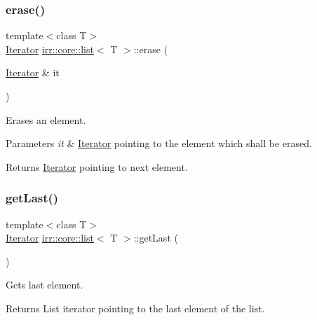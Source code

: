 \subsubsection{\texorpdfstring{erase()}{erase()}}
{\footnotesize\ttfamily template$<$class T$>$ \\
\hyperlink{classirr_1_1core_1_1list_1_1Iterator}{Iterator} \hyperlink{classirr_1_1core_1_1list}{irr\+::core\+::list}$<$ T $>$\+::erase (\begin{DoxyParamCaption}\item[{\hyperlink{classirr_1_1core_1_1list_1_1Iterator}{Iterator} \&}]{it }\end{DoxyParamCaption})\hspace{0.3cm}{\ttfamily [inline]}}



Erases an element. 


\begin{DoxyParams}{Parameters}
{\em it} & \hyperlink{classirr_1_1core_1_1list_1_1Iterator}{Iterator} pointing to the element which shall be erased. \\
\hline
\end{DoxyParams}
\begin{DoxyReturn}{Returns}
\hyperlink{classirr_1_1core_1_1list_1_1Iterator}{Iterator} pointing to next element. 
\end{DoxyReturn}
\mbox{\label{classirr_1_1core_1_1list_a6ba09d4c7865a451e40b5bd5f4c2dd50}} 
\subsubsection{\texorpdfstring{get\+Last()}{getLast()}\hspace{0.1cm}{\footnotesize\ttfamily [1/2]}}
{\footnotesize\ttfamily template$<$class T$>$ \\
\hyperlink{classirr_1_1core_1_1list_1_1Iterator}{Iterator} \hyperlink{classirr_1_1core_1_1list}{irr\+::core\+::list}$<$ T $>$\+::get\+Last (\begin{DoxyParamCaption}{ }\end{DoxyParamCaption})\hspace{0.3cm}{\ttfamily [inline]}}



Gets last element. 

\begin{DoxyReturn}{Returns}
List iterator pointing to the last element of the list. 
\end{DoxyReturn}
\mbox{\label{classirr_1_1core_1_1list_a7b296ee9e099847dadf9a0a18df842e9}} 
